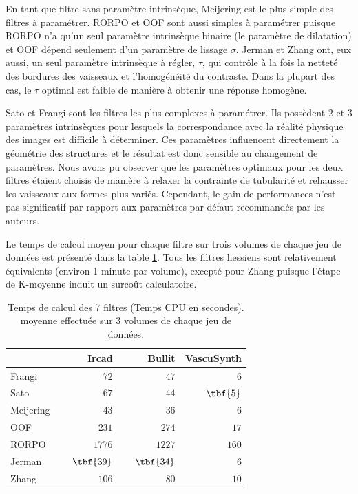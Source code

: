 En tant que filtre sans paramètre intrinsèque, Meijering est le plus simple des filtres à paramétrer. RORPO et OOF sont aussi simples à paramétrer puisque RORPO n'a qu'un seul paramètre intrinsèque binaire (le paramètre de dilatation) et OOF dépend seulement d'un paramètre de lissage $\sigma$. Jerman et Zhang ont, eux aussi, un seul paramètre intrinsèque à régler, $\tau$, qui contrôle à la fois la netteté des bordures des vaisseaux et l'homogénéité du contraste. Dans la plupart des cas, le $\tau$ optimal est faible de manière à obtenir une réponse homogène. 

Sato et Frangi sont les filtres les plus complexes à paramétrer. Ils possèdent $2$ et $3$ paramètres intrinsèques pour lesquels la correspondance avec la réalité physique des images est difficile à déterminer. Ces paramètres influencent directement la géométrie des structures et le résultat est donc sensible au changement de paramètres. Nous avons pu observer que les paramètres optimaux pour les deux filtres étaient choisis de manière à relaxer la contrainte de tubularité et rehausser les vaisseaux aux formes plus variés. Cependant, le gain de performances n'est pas significatif par rapport aux paramètres par défaut recommandés par les auteurs.

Le temps de calcul moyen pour chaque filtre sur trois volumes de chaque jeu de données est présenté dans la table \ref{tab:Computation time benchmark}. Tous les filtres hessiens sont relativement équivalents (environ 1 minute par volume), excepté pour Zhang puisque l'étape de K-moyenne induit un surcoût calculatoire.

\begin{table}
  \centering
  \caption{Temps de calcul des 7 filtres (Temps CPU en secondes). moyenne effectuée sur 3 volumes de chaque jeu de données.}
  \label{tab:Computation time benchmark}
  \begin{tabular}{lrrr}
  \hline
                     & Ircad      & Bullit  & VascuSynth \\
                     \hline
  Frangi    & ~~~~~~~~~$72$  & ~~~~~~~~~$47$   & ~~~~~~~~~$6$   \\
  Sato      & $67$  & $44$   & $\tbf{5}$   \\
  Meijering & $43$  & $36$   & $6$   \\
  OOF       & $231$  & $274$   & $17$   \\
  RORPO     & $1776$  & $1227$   & $160$   \\
  Jerman    & $\tbf{39}$  & $\tbf{34}$   & $6$   \\
  Zhang     & $106$  & $80$   & $10$  \\
  \hline
  \end{tabular}
  \end{table}


